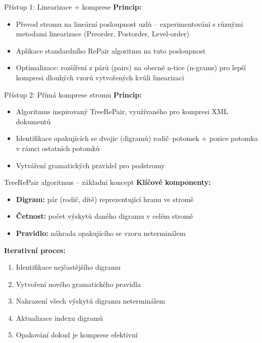 \documentclass[lualatex,hyperref={pdfencoding=auto}]{beamer}
\begin{document}
\begin{frame}{Přístup 1: Linearizace + komprese}
    \textbf{Princip:}
    \begin{itemize}
        \item Převod stromu na lineární posloupnost uzlů -- experimentování s různými metodami linearizace (Preorder, Postorder, Level-order)
        \item Aplikace standardního RePair algoritmu na tuto posloupnost
        \item Optimalizace: rozšíření z párů (pairs) na obecné n-tice (n-grams) pro lepší kompresi dlouhých vzorů vytvořených kvůli linearizaci
    \end{itemize}    
\end{frame}

\begin{frame}{Přístup 2: Přímá komprese stromu}
    \textbf{Princip:}
    \begin{itemize}
        \item Algoritmus inspirovaný TreeRePair, využívaného pro kompresi XML dokumentů \nocite{lohrey2013xml}
        \item Identifikace opakujících se dvojic (digramů) rodič--potomek + pozice potomka v rámci ostatních potomků 
        \item Vytváření gramatických pravidel pro podstromy
    \end{itemize}
    
\end{frame}

\begin{frame}{TreeRePair algoritmus -- základní koncept}
    \textbf{Klíčové komponenty:}
    \begin{itemize}
        \item \textbf{Digram:} pár (rodič, dítě) reprezentující hranu ve stromě
        \item \textbf{Četnost:} počet výskytů daného digramu v celém stromě
        \item \textbf{Pravidlo:} náhrada opakujícího se vzoru neterminálem
    \end{itemize}
    
    \vspace{10pt}
    \textbf{Iterativní proces:}
    \begin{enumerate}
        \item Identifikace nejčastějšího digramu
        \item Vytvoření nového gramatického pravidla
        \item Nahrazení všech výskytů digramu neterminálem
        \item Aktualizace indexu digramů
        \item Opakování dokud je komprese efektivní
    \end{enumerate}
\end{frame}
\end{document}
